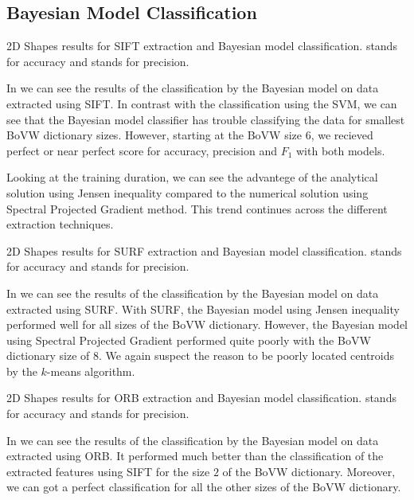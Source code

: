 \subsection{Bayesian Model Classification}
\begin{table}[ht!]
    \centering
    
    \caption[2D Shapes results for SIFT extraction and Bayesian model classification]{2D Shapes results for SIFT extraction and Bayesian model classification.  stands for accuracy and  stands for precision.}
    \label{tab:2d_SIFT_bayes}
\end{table}
In  we can see the results of the classification by the Bayesian model on data extracted using SIFT. In contrast with the classification using the SVM, we can see that the Bayesian model classifier has trouble classifying the data for smallest BoVW dictionary sizes. However, starting at the BoVW size $6$, we recieved perfect or near perfect score for accuracy, precision and $F_1$ with both models.

Looking at the training duration, we can see the advantege of the analytical solution using Jensen inequality compared to the numerical solution using Spectral Projected Gradient method. This trend continues across the different extraction techniques.

\begin{table}[ht!]
    \centering
    
    \caption[2D Shapes results for SURF extraction and Bayesian model classification]{2D Shapes results for SURF extraction and Bayesian model classification.  stands for accuracy and  stands for precision.}
    \label{tab:2d_SURF_bayes}
\end{table}
In  we can see the results of the classification by the Bayesian model on data extracted using SURF. With SURF, the Bayesian model using Jensen inequality performed well for all sizes of the BoVW dictionary. However, the Bayesian model using Spectral Projected Gradient performed quite poorly with the BoVW dictionary size of $8$. We again suspect the reason to be poorly located centroids by the $k$-means algorithm.

\begin{table}[ht!]
    \centering
    
    \caption[2D Shapes results for ORB extraction and Bayesian model classification]{2D Shapes results for ORB extraction and Bayesian model classification.  stands for accuracy and  stands for precision.}
    \label{tab:2d_ORB_bayes}
\end{table}
In  we can see the results of the classification by the Bayesian model on data extracted using ORB. It performed much better than the classification of the extracted features using SIFT for the size $2$ of the BoVW dictionary. Moreover, we can got a perfect classification for all the other sizes of the BoVW dictionary.

